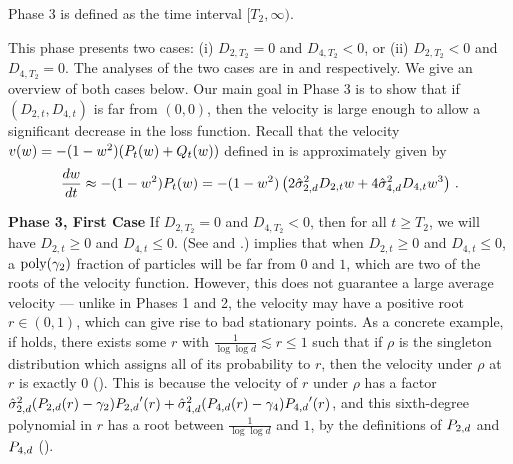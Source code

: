 \begin{definition}[Phase 3] 
Phase 3 is defined as the time interval $[T_2, \infty)$.
\end{definition}

This phase presents two cases: (i) $D_{2, T_2} = 0$ and $D_{4, T_2} < 0$, or (ii) $D_{2, T_2} < 0$ and $D_{4, T_2} = 0$. The analyses of the two cases are in  and  respectively. We give an overview of both cases below. Our main goal in Phase 3 is to show that if $(D_{2, t}, D_{4, t})$ is far from $(0, 0)$, then the velocity is large enough to allow a significant decrease in the loss function. Recall that the velocity $v(w)=-(1 -w^2)(P_t(w)+Q_t(w))$ defined in  is approximately given by
\begin{align}
\frac{d w}{d t} \approx -(1 -w^2)P_t(w)=  -(1 - w^2)\left(2 \hat{\sigma}_{2, d}^2 {D_{2, t}} w + 4 \hat{\sigma}_{4, d}^2 {D_{4, t}} w^3\right) \,.
\end{align}

\noindent \textbf{Phase 3, First Case} If $D_{2, T_2} = 0$ and $D_{4, T_2} < 0$, then for all $t \geq T_2$, we will have $D_{2, t} \geq 0$ and $D_{4, t} \leq 0$. (See  and .)  implies that when $D_{2, t} \geq 0$ and $D_{4, t} \leq 0$, a $\textup{poly}(\gamma_2)$ fraction of particles will be far from $0$ and $1$, which are two of the roots of the velocity function. However, this does not guarantee a large average velocity --- unlike in Phases 1 and 2, the velocity %
may have a positive root $r \in (0, 1)$, which can give rise to bad stationary points. As a concrete example, if  holds, there exists some $r$ with $\frac{1}{\log \log d} \lesssim r \leq 1$ such that if $\rho$ is the singleton distribution which assigns all of its probability to $r$, then the velocity under $\rho$ at $r$ is exactly $0$ (). This is because the velocity of $r$ under $\rho$ has a factor $\hat{\sigma}_{2, d}^2 ({P_{2, d}}(r) - \gamma_2) {P_{2, d}}'(r) + \hat{\sigma}_{4, d}^2 ({P_{4, d}}(r) - \gamma_4) {P_{4, d}}'(r)$, and this sixth-degree polynomial in $r$ has a root between $\frac{1}{\log \log d}$ and $1$, by the definitions of ${P_{2, d}}$ and ${P_{4, d}}$ ().

